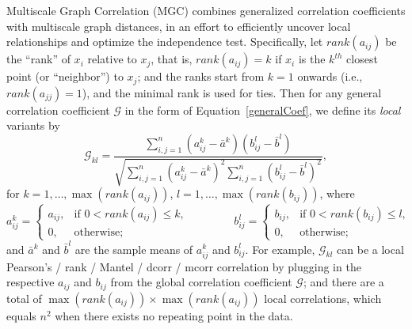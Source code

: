 \documentclass[11pt]{article}
\newcommand{\G}{\mathcal{G}}
\begin{document}
Multiscale Graph Correlation (MGC) combines generalized correlation coefficients with multiscale graph distances, in an effort to efficiently uncover local relationships and optimize the independence test.  Specifically, let $rank(a_{ij})$  be the ``rank'' of $x_i$ relative to $x_j$, that is, $rank(a_{ij})=k$ if $x_i$ is the $k^{th}$ closest point (or ``neighbor'') to $x_j$; and the ranks start from $k=1$ onwards (i.e., $rank(a_{jj})=1$), and the minimal rank is used for ties.  Then for any general correlation coefficient $\G$ in the form of Equation~\ref{generalCoef}, we define its \emph{local} variants by
\begin{equation}
\label{localCoef}
\G_{kl}=\frac{\sum_{i,j=1}^n (a_{ij}^k-\bar{a}^{k}) (b_{ij}^l-\bar{b}^{l})}{\sqrt{\sum_{i,j=1}^n  (a_{ij}^{k}-\bar{a}^{k})^2 \sum_{i,j=1}^n (b_{ij}^{l}-\bar{b}^{l})^2}},
\end{equation}
for $k=1,\ldots,\max(rank(a_{ij}))$, $l=1,\ldots,\max(rank(b_{ij}))$, where
\begin{equation}
\label{localCoef2}
    a_{ij}^k=
    \begin{cases}
      a_{ij}, & \text{if } 0 < rank(a_{ij}) \leq k, \\
      0, & \text{otherwise};
    \end{cases} \qquad \qquad
    b_{ij}^l=
    \begin{cases}
      b_{ij}, & \text{if } 0 < rank(b_{ij}) \leq l, \\
      0, & \text{otherwise};
    \end{cases}
\end{equation}
and $\bar{a}^{k}$ and $\bar{b}^{l}$ are the sample means of $a_{ij}^{k}$ and $b_{ij}^{l}$. For example, $\G_{kl}$ can be a local Pearson's / rank / Mantel / dcorr / mcorr correlation by plugging in the respective $a_{ij}$ and $b_{ij}$ from the global correlation coefficient $\G$; and there are a total of $\max(rank(a_{ij})) \times \max(rank(a_{ij}))$ local correlations, which equals $n^2$ when there exists no repeating point in the data.

\end{document}
